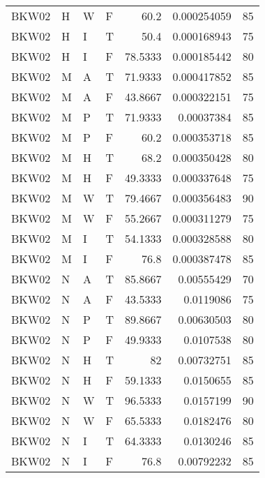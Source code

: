 \begin{table}[htb!]
{\begin{tabular}{llllrrr}
            BKW02    & H     & W     & F          & 60.2       & 0.000254059 & 85       \\
            BKW02    & H     & I     & T          & 50.4       & 0.000168943 & 75       \\
            BKW02    & H     & I     & F          & 78.5333    & 0.000185442 & 80       \\
            BKW02    & M     & A     & T          & 71.9333    & 0.000417852 & 85       \\
            BKW02    & M     & A     & F          & 43.8667    & 0.000322151 & 75       \\
            BKW02    & M     & P     & T          & 71.9333    & 0.00037384  & 85       \\
            BKW02    & M     & P     & F          & 60.2       & 0.000353718 & 85       \\
            BKW02    & M     & H     & T          & 68.2       & 0.000350428 & 80       \\
            BKW02    & M     & H     & F          & 49.3333    & 0.000337648 & 75       \\
            BKW02    & M     & W     & T          & 79.4667    & 0.000356483 & 90       \\
            BKW02    & M     & W     & F          & 55.2667    & 0.000311279 & 75       \\
            BKW02    & M     & I     & T          & 54.1333    & 0.000328588 & 80       \\
            BKW02    & M     & I     & F          & 76.8       & 0.000387478 & 85       \\
            BKW02    & N     & A     & T          & 85.8667    & 0.00555429  & 70       \\
            BKW02    & N     & A     & F          & 43.5333    & 0.0119086   & 75       \\
            BKW02    & N     & P     & T          & 89.8667    & 0.00630503  & 80       \\
            BKW02    & N     & P     & F          & 49.9333    & 0.0107538   & 80       \\
            BKW02    & N     & H     & T          & 82         & 0.00732751  & 85       \\
            BKW02    & N     & H     & F          & 59.1333    & 0.0150655   & 85       \\
            BKW02    & N     & W     & T          & 96.5333    & 0.0157199   & 90       \\
            BKW02    & N     & W     & F          & 65.5333    & 0.0182476   & 80       \\
            BKW02    & N     & I     & T          & 64.3333    & 0.0130246   & 85       \\
            BKW02    & N     & I     & F          & 76.8       & 0.00792232  & 85       \\
            \hline
        \end{tabular}
    }{
    }
\end{table} 
